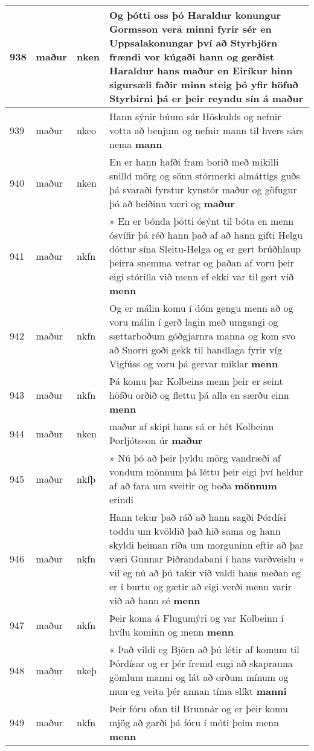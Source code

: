 \documentclass{article}
\begin{document}
\begin{longtable}{p{1cm}|p{1cm}|p{1cm}|p{13cm}}
\hline
938&maður&nken&Og þótti oss þó Haraldur konungur Gormsson vera minni fyrir sér en Uppsalakonungar því að Styrbjörn frændi vor kúgaði hann og gerðist Haraldur hans maður en Eiríkur hinn sigursæli faðir minn steig þó yfir höfuð Styrbirni þá er þeir reyndu sín á \textbf{maður} \\
\hline
939&maður&nkeo&Hann sýnir búum sár Höskulds og nefnir votta að benjum og nefnir mann til hvers sárs nema \textbf{mann} \\
\hline
940&maður&nken&En er hann hafði fram borið með mikilli snilld mörg og sönn stórmerki almáttigs guðs þá svaraði fyrstur kynstór maður og göfugur þó að heiðinn væri og \textbf{maður} \\
\hline
941&maður&nkfn&» En er bónda þótti ósýnt til bóta en menn ósvífir þá réð hann það af að hann gifti Helgu dóttur sína Sleitu-Helga og er gert brúðhlaup þeirra snemma vetrar og þaðan af voru þeir eigi stórilla við menn ef ekki var til gert við \textbf{menn} \\
\hline
942&maður&nkfn&Og er málin komu í dóm gengu menn að og voru málin í gerð lagin með umgangi og sættarboðum góðgjarnra manna og kom svo að Snorri goði gekk til handlaga fyrir víg Vigfúss og voru þá gervar miklar \textbf{menn} \\
\hline
943&maður&nkfn&Þá komu þar Kolbeins menn þeir er seint höfðu orðið og flettu þá alla en særðu einn \textbf{menn} \\
\hline
944&maður&nken&maður af skipi hans sá er hét Kolbeinn Þorljótsson úr \textbf{maður} \\
\hline
945&maður&nkfþ&» Nú þó að þeir þyldu mörg vandræði af vondum mönnum þá léttu þeir eigi því heldur af að fara um sveitir og boða \textbf{mönnum} erindi\\
\hline
946&maður&nkfn&Hann tekur það ráð að hann sagði Þórdísi toddu um kvöldið það hið sama og hann skyldi heiman ríða um morguninn eftir að þar væri Gunnar Þiðrandabani í hans varðveislu « vil eg nú að þú takir við valdi hans meðan eg er í burtu og gætir að eigi verði menn varir við að hann sé \textbf{menn} \\
\hline
947&maður&nkfn&Þeir koma á Flugumýri og var Kolbeinn í hvílu kominn og menn \textbf{menn} \\
\hline
948&maður&nkeþ&« Það vildi eg Björn að þú létir af komum til Þórdísar og er þér fremd engi að skaprauna gömlum manni og lát að orðum mínum og mun eg veita þér annan tíma slíkt \textbf{manni} \\
\hline
949&maður&nkfn&Þeir fóru ofan til Brunnár og er þeir komu mjög að garði þá fóru í móti þeim menn \textbf{menn} \\

\end{longtable}
\end{document}
